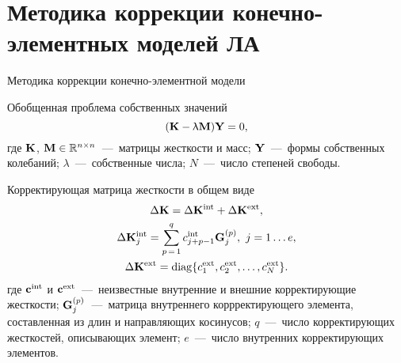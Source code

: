 \section{Методика коррекции конечно-элементных моделей ЛА}

\begin{frame}{Методика коррекции конечно-элементной модели}
	\begin{block}{Обобщенная проблема собственных значений}
		\begin{equation}
			(\mathbf{K} - \uplambda \mathbf{M}) \mathbf{Y} = 0,
		\end{equation}
		где $ \mathbf{K} $, $ \mathbf{M} \in \mathbb{R} ^ {n \times n}$~---~матрицы жесткости и масс; $ \mathbf{Y} $~---~формы собственных колебаний; $ \lambda $~---~собственные числа; $ N $~---~число степеней свободы.
	\end{block}
	\begin{block}{Корректирующая матрица жесткости в общем виде}
 		\begin{equation}
 			\begin{gathered}
 				\Delta \mathbf{K} = \Delta \mathbf{K} ^ {\text{int}} + \Delta \mathbf{K} ^ {\text{ext}}, \\
				\Delta \mathbf{K} ^ {\text{int}}_j = \sum\limits_{p\,=\,1}^{q} c ^ {\text{int}}_{j+p-1} \mathbf{G}_j^{(p)}, \ j = 1 \hdots e, \\
				\Delta \mathbf{K} ^ {\text{ext}} = \operatorname{diag} \{ c ^ {\text{ext}}_1, c ^ {\text{ext}}_2, \hdots, c ^ {\text{ext}}_N \}.
			\end{gathered}
		\end{equation}
		где $ \mathbf{c} ^ {\text{int}} $ и $ \mathbf{c} ^ {\text{ext}} $~---~неизвестные внутренние и внешние корректирующие жесткости; $ \mathbf{G}_j^{(p)} $~---~матрица внутреннего коррректирующего элемента, составленная из длин и направляющих косинусов; $ q $~---~число корректирующих жесткостей, описывающих элемент; $ e $~---~число внутренних корректирующих элементов.
	\end{block}
\end{frame}

